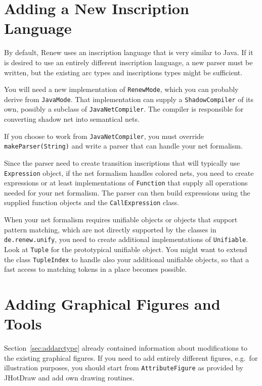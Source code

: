 \section{Adding a New Inscription Language}

By default, Renew uses an inscription language that is very 
similar to Java. If it is desired to use an entirely different
inscription language, a new parser must be written, but the existing
arc types and inscriptions types might be sufficient.

You will need a new implementation of \texttt{RenewMode},
which you can probably derive from \texttt{JavaMode}.
That implementation can supply a \texttt{ShadowCompiler} of its own,
possibly a subclass of \texttt{JavaNetCompiler}. The compiler
is responsible for converting shadow net into semantical nets.

If you choose to work from \texttt{JavaNetCompiler},
you must override \texttt{makeParser(String)}
and write a parser that can handle your net formalism.

Since the parser need to create transition inscriptions that
will typically use \texttt{Expression} object, if the net formalism
handles colored nets, you need to create expressions or at least
implementations of \texttt{Function} that supply all operations
needed for your net formalism. The parser can then build
expressions using the supplied function objects and
the \texttt{CallExpression} class.

When your net formalism requires unifiable objects or objects
that support pattern matching, which are not directly
supported by the classes in \texttt{de.renew.unify},
you need to create additional implementations of \texttt{Unifiable}.
Look at \texttt{Tuple} for the prototypical unifiable
object. You might want to extend the class \texttt{TupleIndex}
to handle also your additional unifiable objects, so that
a fast access to matching tokens in a place becomes possible.


\section{Adding Graphical Figures and Tools}

Section~\ref{sec:addarctype} already contained information
about modifications to the existing graphical figures.
If you need to add entirely different figures, e.g.~for
illustration purposes, you should start from
\texttt{AttributeFigure} as provided by JHotDraw and add
own drawing routines.

